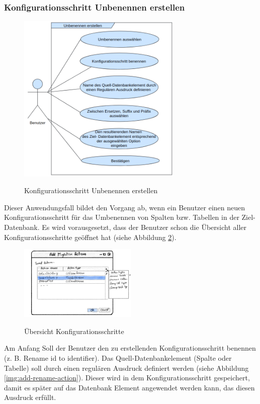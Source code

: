 \subsubsection{Konfigurationsschritt \textbf{Unbenennen} erstellen}
\label{section:umbenennen}
	\begin{figure}[H]
		\caption{Konfigurationsschritt \glqq Unbenennen \grqq erstellen}
		\centering
		\includegraphics[width=0.7\textwidth]{images/af/af-umbenennen}
		\label{img:af-umbenennen}
	\end{figure}
Dieser Anwendungsfall bildet den Vorgang ab, wenn ein Benutzer einen neuen Konfigurationsschritt für das Umbenennen von Spalten bzw. Tabellen in der Ziel-Datenbank. Es wird vorausgesetzt, dass der Benutzer schon die Übersicht aller Konfigurationsschritte geöffnet hat (siehe Abbildung \ref{img:actions-overview}). \\
\begin{figure}[H]
	\caption{Übersicht Konfigurationsschritte}
	\centering
	\includegraphics[width=0.5\textwidth]{images/actions-overview}
	\label{img:actions-overview}
\end{figure}
Am Anfang Soll der Benutzer den zu erstellenden Konfigurationsschritt benennen (z. B. Rename id to identifier). Das Quell-Datenbankelement (Spalte oder Tabelle) soll durch einen regulären Ausdruck definiert werden (siehe Abbildung \ref{img:add-rename-action}). Dieser wird in dem Konfigurationsschritt gespeichert, damit es später auf das Datenbank Element angewendet werden kann, das diesen Ausdruck erfüllt.
